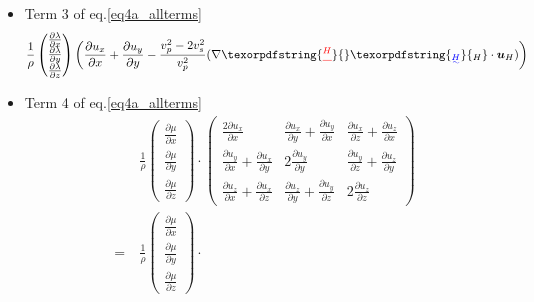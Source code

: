 \documentclass{article} %
\providecommand{\DIFaddtex}[1]{{\protect\color{blue}\uwave{#1}}} %
\providecommand{\DIFdeltex}[1]{{\protect\color{red}\sout{#1}}}                      %
\providecommand{\DIFaddbegin}{} %
\providecommand{\DIFaddend}{} %
\providecommand{\DIFdelbegin}{} %
\providecommand{\DIFdelend}{} %
\providecommand{\DIFadd}[1]{\texorpdfstring{\DIFaddtex{#1}}{#1}} %
\providecommand{\DIFdel}[1]{\texorpdfstring{\DIFdeltex{#1}}{}} %
\newcommand{\DIFscaledelfig}{0.5}
\newlength{\DIFdelgraphicswidth} %
\newlength{\DIFdelgraphicsheight} %
\newcommand{\DIFaddincludegraphics}[2][]{{\color{blue}\fbox{\DIFOincludegraphics[#1]{#2}}}} %
\newcommand{\DIFdelincludegraphics}[2][]{%
\sbox{\DIFdelgraphicsbox}{\DIFOincludegraphics[#1]{#2}}%
\settoboxwidth{\DIFdelgraphicswidth}{\DIFdelgraphicsbox} %
\settoboxtotalheight{\DIFdelgraphicsheight}{\DIFdelgraphicsbox} %
\scalebox{\DIFscaledelfig}{%
\parbox[b]{\DIFdelgraphicswidth}{\usebox{\DIFdelgraphicsbox}\\[-\baselineskip] \rule{\DIFdelgraphicswidth}{0em}}\llap{\resizebox{\DIFdelgraphicswidth}{\DIFdelgraphicsheight}{%
\setlength{\unitlength}{\DIFdelgraphicswidth}%
\begin{picture}(1,1)%
\thicklines\linethickness{2pt} %
{\color[rgb]{1,0,0}\put(0,0){\framebox(1,1){}}}%
{\color[rgb]{1,0,0}\put(0,0){\line( 1,1){1}}}%
{\color[rgb]{1,0,0}\put(0,1){\line(1,-1){1}}}%
\end{picture}%
}\hspace*{3pt}}} %
} %
\DeclareRobustCommand{\DIFaddbegin}{\DIFOaddbegin \let\includegraphics\DIFaddincludegraphics} %
\DeclareRobustCommand{\DIFaddend}{\DIFOaddend \let\includegraphics\DIFOincludegraphics} %
\DeclareRobustCommand{\DIFdelbegin}{\DIFOdelbegin \let\includegraphics\DIFdelincludegraphics} %
\DeclareRobustCommand{\DIFdelend}{\DIFOaddend \let\includegraphics\DIFOincludegraphics} %
\begin{document}
	\begin{itemize}
		\item Term 3 of eq.\eqref{eq4a_allterms}
		\begin{align}
			\frac{1}{\rho}
			\begin{pmatrix}
				\frac{\partial \lambda}{\partial x}\\
				\frac{\partial \lambda}{\partial y}\\
				\frac{\partial \lambda}{\partial z}
			\end{pmatrix}
			\bigg(\frac{\partial u_{x}}{\partial x} + \frac{\partial u_{y}}{\partial y} - \frac{v_{p}^{2} - 2v_{s}^{2}}{v_{p}^{2}} (\nabla\DIFdelbegin \DIFdel{^{H} }\DIFdelend \DIFaddbegin \DIFadd{_{H} }\DIFaddend \cdot \bm{u}_{H}) \bigg) 
		\end{align}

		\item Term 4  of eq.\eqref{eq4a_allterms}
		\begin{align}
			&\frac{1}{\rho} 
			\begin{pmatrix}
				\frac{\partial \mu}{\partial x}\\
				\frac{\partial \mu}{\partial y}\\
				\frac{\partial \mu}{\partial z}
			\end{pmatrix}
			\cdot 
			\begin{pmatrix}
				\frac{2\partial u_{x}}{\partial x} & \frac{\partial u_{x}}{\partial y}  + \frac{\partial u_{y}}{\partial x}& \frac{\partial u_{x}}{\partial z} + \frac{\partial u_{z}}{\partial x}\\
				\frac{\partial u_{y}}{\partial x} + \frac{\partial u_{x}}{\partial y}& 2\frac{\partial u_{y}}{\partial y} & \frac{\partial u_{y}}{\partial z} + \frac{\partial u_{z}}{\partial y}\\
				\frac{\partial u_{z}}{\partial x} + \frac{\partial u_{x}}{\partial z}& \frac{\partial u_{z}}{\partial y} + \frac{\partial u_{y}}{\partial z}& 2\frac{\partial u_{z}}{\partial z}
			\end{pmatrix} \\
			= \:
			&\frac{1}{\rho} 
			\begin{pmatrix}
				\frac{\partial \mu}{\partial x}\\
				\frac{\partial \mu}{\partial y}\\
				\frac{\partial \mu}{\partial z}
			\end{pmatrix}
			\cdot 
			\DIFdelbegin %

\end{align}
\end{itemize}
\end{document}
